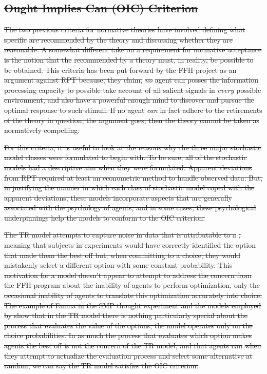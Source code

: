 \documentclass[11pt,a4paper]{report}
\providecommand{\DIFdeltex}[1]{{\protect\color{red}\sout{#1}}}                      %
\providecommand{\DIFdelbegin}{} %
\providecommand{\DIFdel}[1]{\texorpdfstring{\DIFdeltex{#1}}{}} %
\newcommand{\DIFscaledelfig}{0.5}
\newlength{\DIFdelgraphicswidth} %
\newlength{\DIFdelgraphicsheight} %
\newcommand{\DIFdelincludegraphics}[2][]{%
\sbox{\DIFdelgraphicsbox}{\DIFOincludegraphics[#1]{#2}}%
\settoboxwidth{\DIFdelgraphicswidth}{\DIFdelgraphicsbox} %
\settoboxtotalheight{\DIFdelgraphicsheight}{\DIFdelgraphicsbox} %
\scalebox{\DIFscaledelfig}{%
\parbox[b]{\DIFdelgraphicswidth}{\usebox{\DIFdelgraphicsbox}\\[-\baselineskip] \rule{\DIFdelgraphicswidth}{0em}}\llap{\resizebox{\DIFdelgraphicswidth}{\DIFdelgraphicsheight}{%
\setlength{\unitlength}{\DIFdelgraphicswidth}%
\begin{picture}(1,1)%
\thicklines\linethickness{2pt} %
{\color[rgb]{1,0,0}\put(0,0){\framebox(1,1){}}}%
{\color[rgb]{1,0,0}\put(0,0){\line( 1,1){1}}}%
{\color[rgb]{1,0,0}\put(0,1){\line(1,-1){1}}}%
\end{picture}%
}\hspace*{3pt}}} %
} %
\DeclareRobustCommand{\DIFdelbegin}{\DIFOdelbegin \let\includegraphics\DIFdelincludegraphics} %
\begin{document}
\DIFdelbegin \subsection{\DIFdel{Ought Implies Can (OIC) Criterion}}
\addtocounter{subsection}{-1}%

\DIFdel{The two previous criteria for normative theories have involved defining what specific }%
\DIFdel{are recommended by the theory and discussing whether they are reasonable.
A somewhat different take on a requirement for normative acceptance is the notion that the }%
\DIFdel{recommended by a theory must, in reality, be possible to be obtained.
This criteria has been put forward by the FFH project as an argument against RPT because, they claim, }\textit{\DIFdel{no}} %
\DIFdel{agent can posses the information processing capacity to possible take account of all salient signals in }\textit{\DIFdel{every}} %
\DIFdel{possible environment, and also have a powerful enough mind to discover and pursue the optimal response to such stimuli.
If no agent }\textit{\DIFdel{can}} %
\DIFdel{in fact adhere to the retirements of the theory in question, the argument goes, then the theory cannot be taken as normatively compelling.
}%

\DIFdel{For this criteria, it is useful to look at the reasons why the three major stochastic model classes were formulated to begin with.
To be sure, all of the stochastic models had a descriptive aim when they were formulated.
Apparent deviations from RPT required at least an econometric method to handle observed data.
But, in justifying the manner in which each class of stochastic model coped with the apparent deviations, these models incorporate aspects that are generally associated with the psychology of agents, and in some cases, these psychological underpinnings help the models to conform to the OIC criterion.
}%

\DIFdel{The TR model attempts to capture noise in data that is attributable to a }%
\DIFdel{, meaning that subjects in experiments would have correctly identified the option that made them the best off but, when committing to a choice, they would mistakenly select a different option with some constant probability.
This motivation for a model doesn't appear to attempt to address the concern from the FFH program about the inability of agents to perform optimization, only the occasional inability of agents to translate this optimization accurately into choice.
The example of Emma in the SMP thought experiment and the models employed by \textcite{Loomes2002} show that in the TR model there is nothing particularly special about the process that evaluates the value of the options, the model operates only on the choice probabilities.
In as much the process that evaluates which option makes agents the best off is not the concern of the TR model, and that agents can }%
\DIFdel{when they attempt to actualize the evaluation process and select some alternative at random, we can say the TR model satisfies the OIC criterion.
}%
\end{document}
